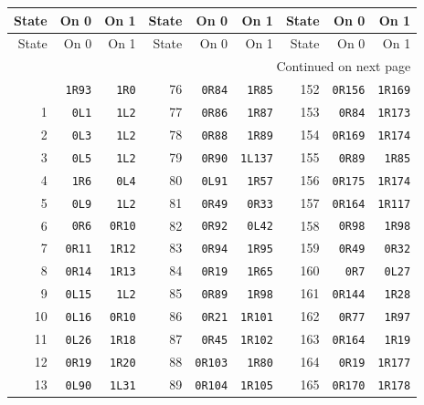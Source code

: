 {\small
\setlength{\tabcolsep}{5pt}
\begin{longtable}{rrr@{\hspace{8mm}}rrr@{\hspace{8mm}}rrr}
\toprule
State & On 0 & On 1 & State & On 0 & On 1 & State & On 0 & On 1\\
\midrule\endfirsthead
\toprule
State & On 0 & On 1 & State & On 0 & On 1 & State & On 0 & On 1\\
\midrule\endhead
\midrule\multicolumn{9}{r}{Continued on next page}\\\endfoot
\bottomrule\endlastfoot
0 & \texttt{1R93} & \texttt{1R0} & 76 & \texttt{0R84} & \texttt{1R85} & 152 & \texttt{0R156} & \texttt{1R169}\\
1 & \texttt{0L1} & \texttt{1L2} & 77 & \texttt{0R86} & \texttt{1R87} & 153 & \texttt{0R84} & \texttt{1R173}\\
2 & \texttt{0L3} & \texttt{1L2} & 78 & \texttt{0R88} & \texttt{1R89} & 154 & \texttt{0R169} & \texttt{1R174}\\
3 & \texttt{0L5} & \texttt{1L2} & 79 & \texttt{0R90} & \texttt{1L137} & 155 & \texttt{0R89} & \texttt{1R85}\\
4 & \texttt{1R6} & \texttt{0L4} & 80 & \texttt{0L91} & \texttt{1R57} & 156 & \texttt{0R175} & \texttt{1R174}\\
5 & \texttt{0L9} & \texttt{1L2} & 81 & \texttt{0R49} & \texttt{0R33} & 157 & \texttt{0R164} & \texttt{1R117}\\
6 & \texttt{0R6} & \texttt{0R10} & 82 & \texttt{0R92} & \texttt{0L42} & 158 & \texttt{0R98} & \texttt{1R98}\\
7 & \texttt{0R11} & \texttt{1R12} & 83 & \texttt{0R94} & \texttt{1R95} & 159 & \texttt{0R49} & \texttt{0R32}\\
8 & \texttt{0R14} & \texttt{1R13} & 84 & \texttt{0R19} & \texttt{1R65} & 160 & \texttt{0R7} & \texttt{0L27}\\
9 & \texttt{0L15} & \texttt{1L2} & 85 & \texttt{0R89} & \texttt{1R98} & 161 & \texttt{0R144} & \texttt{1R28}\\
10 & \texttt{0L16} & \texttt{0R10} & 86 & \texttt{0R21} & \texttt{1R101} & 162 & \texttt{0R77} & \texttt{1R97}\\
11 & \texttt{0L26} & \texttt{1R18} & 87 & \texttt{0R45} & \texttt{1R102} & 163 & \texttt{0R164} & \texttt{1R19}\\
12 & \texttt{0R19} & \texttt{1R20} & 88 & \texttt{0R103} & \texttt{1R80} & 164 & \texttt{0R19} & \texttt{1R177}\\
13 & \texttt{0L90} & \texttt{1L31} & 89 & \texttt{0R104} & \texttt{1R105} & 165 & \texttt{0R170} & \texttt{1R178}\\

\end{longtable}}
